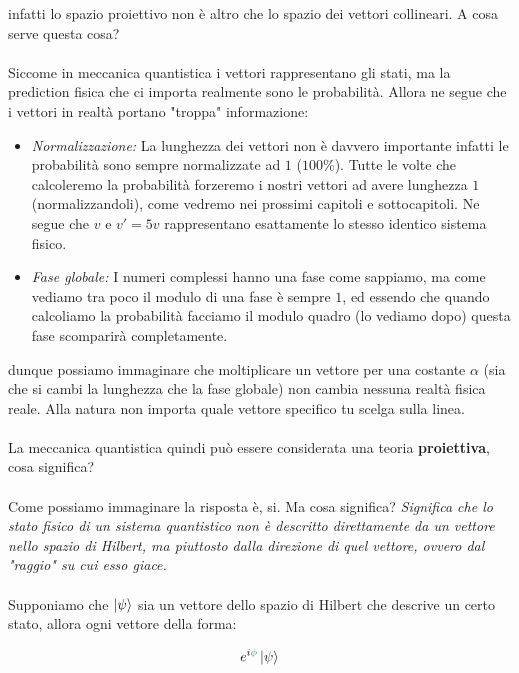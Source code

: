 	infatti lo spazio proiettivo non è altro che lo spazio dei vettori collineari. A cosa serve questa cosa?
	\\
	\\
	Siccome in meccanica quantistica i vettori rappresentano gli stati, ma la prediction fisica che ci importa realmente sono le probabilità. Allora ne segue che i vettori in realtà portano "troppa" informazione:
	
\begin{itemize}
	\item \textit{Normalizzazione:} La lunghezza dei vettori non è davvero importante infatti le probabilità sono sempre normalizzate ad $1$ ($100\%$). Tutte le volte che calcoleremo la probabilità forzeremo i nostri vettori ad avere lunghezza $1$ (normalizzandoli), come vedremo nei prossimi capitoli e sottocapitoli. Ne segue che $v$ e $v' = 5 v$ rappresentano esattamente lo stesso identico sistema fisico.
	\item \textit{Fase globale:} I numeri complessi hanno una fase come sappiamo, ma come vediamo tra poco il modulo di una fase è sempre $1$, ed essendo che quando calcoliamo la probabilità facciamo il modulo quadro (lo vediamo dopo) questa fase scomparirà completamente.
\end{itemize}

	dunque possiamo immaginare che moltiplicare un vettore per una costante $\alpha$ (sia che si cambi la lunghezza che la fase globale) non cambia nessuna realtà fisica reale. Alla natura non importa quale vettore specifico tu scelga sulla linea.
	\\
	\\
	La meccanica quantistica quindi può essere considerata una teoria \textbf{proiettiva}, cosa significa?
	 \\
	 \\
	 Come possiamo immaginare la risposta è, si. Ma cosa significa? \textit{Significa che lo stato fisico di un sistema quantistico non è descritto direttamente da un vettore nello spazio di Hilbert, ma piuttosto dalla direzione di quel vettore, ovvero dal "raggio" su cui esso giace.}
	 \\
	 \\
	 Supponiamo che $\ket{\psi}$ sia un vettore dello spazio di Hilbert che descrive un certo stato, allora ogni vettore della forma:

\begin{align*}
	e^{i\textcolor{ForestGreen}{\phi}} \ket{\psi}
\end{align*}
		
